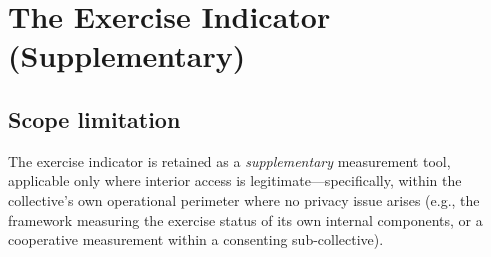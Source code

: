 \section{The Exercise Indicator (Supplementary)}
\label{app:exercise_indicator}

\subsection{Scope limitation}

The exercise indicator is retained as a \emph{supplementary}
measurement tool, applicable only where interior access is
legitimate---specifically, within the
collective's own operational perimeter where no privacy issue
arises (e.g., the framework measuring the exercise status of its
own internal components, or a cooperative measurement within a
consenting sub-collective).

